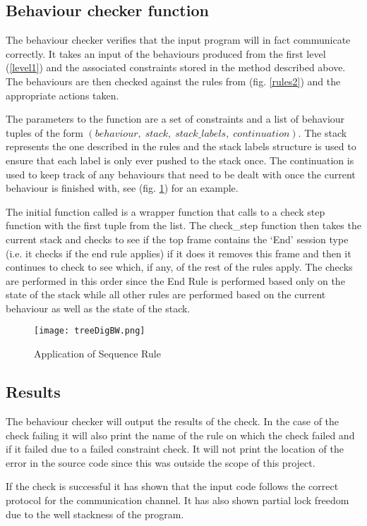 \subsection{Behaviour checker function}

The behaviour checker verifies that the input program will in fact communicate correctly. It takes an input of the behaviours produced from the first level (\ref{level1}) and the associated constraints stored in the method described above. The behaviours are then checked against the rules from (fig. \ref{rules2}) and the appropriate actions taken. 

The parameters to the function are a set of constraints and a list of behaviour tuples of the form $(behaviour,\; stack,\; stack\_labels,\; continuation)$. The stack represents the one described in the rules and the stack labels structure is used to ensure that each label is only ever pushed to the stack once. The continuation is used to keep track of any behaviours that need to be dealt with once the current behaviour is finished with, see (fig. \ref{seq}) for an example. 

The initial function called is a wrapper function that calls to a check step function with the first tuple from the list. The check_step function then takes the current stack and checks to see if the top frame contains the `End' session type (i.e. it checks if the end rule applies) if it does it removes this frame and then it continues to check to see which, if any, of the rest of the rules apply. The checks are performed in this order since the End Rule is performed based only on the state of the stack while all other rules are performed based on the current behaviour as well as the state of the stack. 

\begin{figure}
\texttt{[image: treeDigBW.png]}
\caption{Application of Sequence Rule}
\label{seq}
\end{figure}

\subsection{Results}
The behaviour checker will output the results of the check. In the case of the check failing it will also print the name of the rule on which the check failed and if it failed due to a failed constraint check. It will not print the location of the error in the source code since this was outside the scope of this project.

If the check is successful it has shown that the input code follows the correct protocol for the communication channel. It has also shown partial lock freedom due to the well stackness of the program. 

